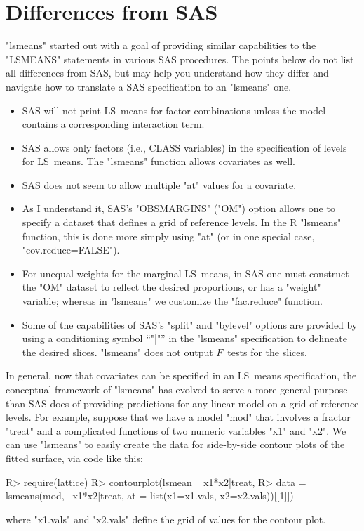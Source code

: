 \documentclass{article}
\begin{document}
\section{Differences from SAS}
"lsmeans" started out with a goal of providing similar capabilities to the "LSMEANS" statements in various SAS procedures. The points below do not list all differences from SAS, but may help you understand how they differ and navigate how to translate a SAS specification to an "lsmeans" one.
\begin{itemize}
\item SAS will not print LS~means for factor combinations unless the model contains a corresponding interaction term.
\item SAS allows only factors (i.e., CLASS variables) in the specification of levels for LS~means. The "lsmeans" function allows covariates as well.
\item SAS does not seem to allow multiple "at" values for a covariate.
\item As I understand it, SAS's "OBSMARGINS" ("OM") option allows one to specify a dataset that defines a grid of reference levels. In the R "lsmeans" function, this is done more simply using "at" (or in one special case,  "cov.reduce=FALSE").
\item For unequal weights for the marginal LS~means, in SAS one must construct the "OM" dataset to reflect the desired proportions, or has a "weight" variable; whereas in "lsmeans" we customize the "fac.reduce" function.
\item Some of the capabilities of SAS's "split" and "bylevel" options are provided by using a conditioning symbol ``"|"'' in the "lsmeans" specification to delineate the desired slices. "lsmeans" does not output $F$~tests for the slices.
\end{itemize}

\ifx %
In general, now that covariates can be specified in an LS~means specification, the conceptual framework of "lsmeans" has evolved to serve a more general purpose than SAS does of providing predictions for any linear model on a grid of reference levels. For example, suppose that we have a model "mod" that involves a fractor "treat" and a complicated functions of two numeric variables "x1" and "x2". We can use "lsmeans" to easily create the data for side-by-side contour plots of the fitted surface, via code like this:
\begin{Winput}
R> require(lattice)
R> contourplot(lsmean ~ x1*x2|treat, 
R>     data = lsmeans(mod, ~x1*x2|treat, at = list(x1=x1.vals, x2=x2.vals))[[1]])
\end{Winput}
where "x1.vals" and "x2.vals" define the grid of values for the contour plot.
\fi %
\end{document}
